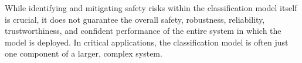
While identifying and mitigating safety risks within the classification model itself is crucial, it does not guarantee the overall safety, robustness, reliability, trustworthiness, and confident performance of the entire system in which the model is deployed. In critical applications, the classification model is often just one component of a larger, complex system.









